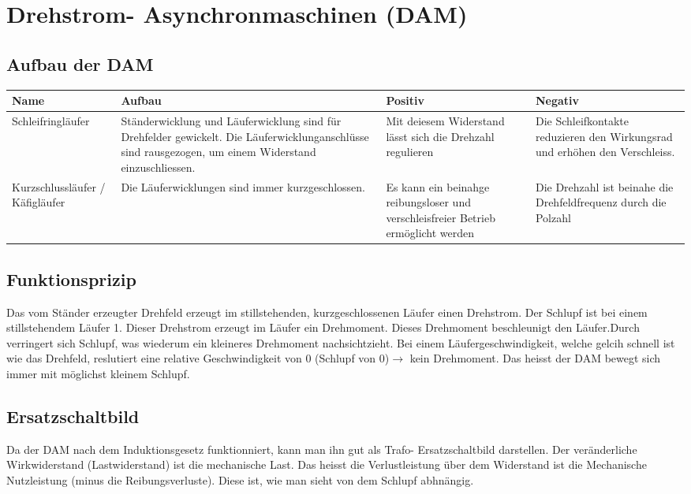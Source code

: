 \newpage

\section{Drehstrom- Asynchronmaschinen (DAM)}
	\subsection{Aufbau der DAM}
		\begin{tabular}[c]{| p{3cm} | p{5cm} | p{4cm} | p{5cm} |}
        \hline
        Name & Aufbau & Positiv & Negativ\\
        \hline
        Schleifringläufer	& Ständerwicklung und Läuferwicklung sind für
        Drehfelder gewickelt. Die Läuferwicklunganschlüsse sind rausgezogen, um
        einem Widerstand einzuschliessen.
        & Mit deiesem Widerstand lässt sich die Drehzahl regulieren
        & Die Schleifkontakte reduzieren den Wirkungsrad und erhöhen den
        Verschleiss.\\
        \hline
        Kurzschlussläufer / Käfigläufer &
        Die Läuferwicklungen sind immer kurzgeschlossen.
        & Es kann ein beinahge reibungsloser und verschleisfreier Betrieb
        ermöglicht werden
        & Die Drehzahl ist beinahe die Drehfeldfrequenz durch die Polzahl\\
        \hline
        \end{tabular}
 	\subsection{Funktionsprizip} 
 		Das vom Ständer erzeugter Drehfeld erzeugt im
 		stillstehenden, kurzgeschlossenen Läufer einen Drehstrom. Der Schlupf
 		ist bei einem stillstehendem Läufer 1. Dieser Drehstrom erzeugt im Läufer ein
 		Drehmoment. Dieses Drehmoment beschleunigt den Läufer.Durch verringert sich
 		Schlupf, was wiederum ein kleineres Drehmoment nachsichtzieht.
 		Bei einem Läufergeschwindigkeit, welche gelcih schnell ist wie das
 		Drehfeld, reslutiert eine relative Geschwindigkeit von 0
 		(Schlupf von 0)$\rightarrow $ kein Drehmoment. Das heisst der DAM bewegt
 		sich immer mit möglichst kleinem Schlupf.
	\subsection{Ersatzschaltbild}
		Da der DAM nach dem Induktionsgesetz funktionniert, kann man ihn gut als
		Trafo- Ersatzschaltbild darstellen. Der veränderliche Wirkwiderstand
		(Lastwiderstand) ist die mechanische Last. Das heisst die Verlustleistung
	 über dem Widerstand ist die Mechanische Nutzleistung (minus die
	 Reibungsverluste). Diese ist, wie man sieht von dem Schlupf abhnängig.
		
